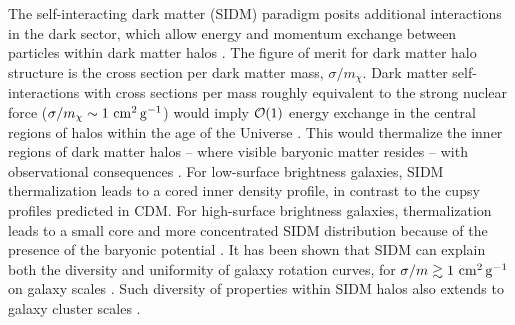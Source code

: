 The self-interacting dark matter (SIDM) paradigm \citep{1992ApJ...398...43C,Spergel:1999mh,Dave:2000ar,Firmani:2000ce} posits additional interactions in the dark sector, which allow energy and momentum exchange between particles within dark matter halos \citep[see][for a recent review]{Tulin:2017ara}. The figure of merit for dark matter halo structure is the cross section per dark matter mass, $\sigma/m_\chi$.
Dark matter self-interactions with cross sections per mass roughly equivalent to the strong nuclear force ($\sigma/m_\chi \sim 1 \mathrm{\,\mathrm{\,cm}^2\mathrm{\,g}^{-1}}$) would imply ${\cal O}(1)$ energy exchange in the central regions of halos within the age of the Universe \citep{2012MNRAS.423.3740V,2013MNRAS.431L..20Z,2013MNRAS.430..105P,Rocha:2012jg}. This  would thermalize the inner regions of dark matter halos -- where visible baryonic matter resides -- with observational consequences \citep[\eg][]{Kaplinghat:2013xca}. For low-surface brightness galaxies, SIDM thermalization leads to a cored inner density profile, in contrast to the cupsy profiles predicted in CDM. For high-surface brightness galaxies, thermalization leads to a small core and more concentrated SIDM distribution because of the presence of the baryonic potential \citep{Kaplinghat:2015aga}. It has been shown that SIDM can explain both the diversity and uniformity of galaxy rotation curves, for $\sigma/m\gtrsim 1\mathrm{\,\mathrm{\,cm}^2\mathrm{\,g}^{-1}}$ on galaxy scales \citep{Kamada:2016euw,Creasey:2016jaq,Ren:2018jpt}. Such diversity of properties within SIDM halos also extends to galaxy cluster scales \citep{Robertson:2017mgj}.

